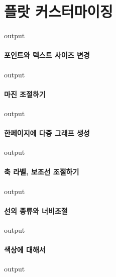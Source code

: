 \documentclass{book}
\begin{document}
\section{플랏 커스터마이징}
\begin{Schunk}
\begin{Soutput}
output
\end{Soutput}
\end{Schunk}
\paragraph{포인트와 텍스트 사이즈 변경}
\begin{Schunk}
\begin{Soutput}
output
\end{Soutput}
\end{Schunk}
\paragraph{마진 조절하기}
\begin{Schunk}
\begin{Soutput}
output
\end{Soutput}
\end{Schunk}
\paragraph{한페이지에 다중 그래프 생성}
\begin{Schunk}
\begin{Soutput}
output
\end{Soutput}
\end{Schunk}
\paragraph{축 라벨, 보조선 조절하기}
\begin{Schunk}
\begin{Soutput}
output
\end{Soutput}
\end{Schunk}
\paragraph{선의 종류와 너비조절}
\begin{Schunk}
\begin{Soutput}
output
\end{Soutput}
\end{Schunk}
\paragraph{색상에 대해서}
\begin{Schunk}
\begin{Soutput}
output
\end{Soutput}
\end{Schunk}
\end{document}

